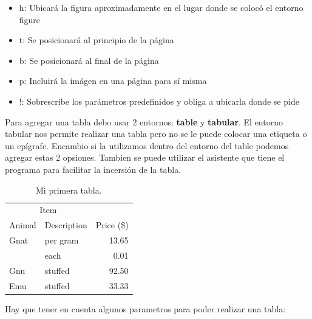 \documentclass[a4paper,12pt]{article} %
\begin{document}
\begin{itemize}
\item{h: Ubicará la figura aproximadamente en el lugar donde se colocó el entorno figure}
\item{t: Se posicionará al principio de la página}
\item{b: Se posicionará al final de la página}
\item{p: Incluirá la imágen en una página para sí misma}
\item{!: Sobrescribe los parámetros predefinidos y obliga a ubicarla donde se pide}
\end{itemize}

Para agregar una tabla debo usar 2 entornos: \textbf{table} y \textbf{tabular}. El entorno tabular nos permite realizar una tabla pero no se le puede colocar una etiqueta o un epígrafe. Encambio si la utilizamos dentro del entorno del table podemos agregar estas 2 opsiones. Tambien se puede utilizar el asistente que tiene el programa para facilitar la incersión de la tabla.

\begin{table}[h] %
 \centering %
 \begin{tabular}{ll|r} %
  \hline
  \multicolumn{2}{c|}{Item} \\
  \cline{1-2}
  Animal    & Description & Price (\$) \\
  \hline
  Gnat      & per gram    & 13.65      \\
            & each        & 0.01       \\
  Gnu       & stuffed     & 92.50      \\
  Emu       & stuffed     & 33.33      \\
  \hline
 \end{tabular}
 \caption{Mi primera tabla.}
 \label{tab:tabla1}
\end{table}
Hay que tener en cuenta algunos parametros para poder realizar una tabla:
\end{document}
